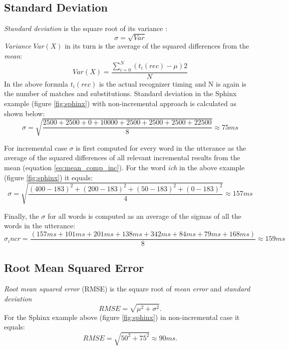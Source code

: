 \subsection {Standard Deviation}
\textit {Standard deviation} is the square root of its variance
:\begin{equation} \sigma=\sqrt {Var}
\end{equation}
\textit {Variance} $Var(X)$ in its turn is the average of the squared
differences from the \textit {mean}:
\begin{equation} Var(X)=\frac{\sum_{i=0}^N (t_i(rec)-\mu)2}{N}
\end{equation}
In the above formula $t_i(rec)$ is the actual recognizer timing and N is again
is the number of matches and substitutions.  Standard deviation in the Sphinx
example (figure \ref{fig:sphinx}) with non-incremental approach is calculated as
shown below:
\begin{equation} \sigma=\sqrt {\frac
{2500+2500+0+10000+2500+2500+2500+22500}{8}}\approx 75 ms
\end{equation}

For incremental case $\sigma$ is first computed for every word in the utterance
as the average of the squared differences of all relevant incremental results from
the mean (equation \ref{eq:mean_comp_inc}). For the word \textit {ich} in the
above example (figure \ref{fig:sphinx}) it equals:
\begin{equation} \sigma=\sqrt {\frac
{(400-183)^2+(200-183)^2+(50-183)^2+(0-183)^2}{4}}\approx 157 ms
\end{equation}

Finally, the $\sigma$ for all words is computed as an average of the sigmas of
all the words in the utterance:
\begin{equation} \sigma_incr=\frac
{(157 ms+101 ms + 201 ms+138 ms+342 ms+ 84ms +79ms +168 ms)}{8}\approx 159
ms
\end{equation}


\subsection {Root Mean Squared Error}
\textit {Root mean squared error} (RMSE) is the square root of  \textit {mean
error}  and \textit {standard deviation} \begin{equation} RMSE=\sqrt
{\mu^2+\sigma^2}. 
\end{equation}
For the Sphinx example above  (figure \ref{fig:sphinx}) in  non-incremental case
it equals:
\begin{equation} RMSE=\sqrt
{50^2+75^2} \approx 90 ms. 
\end{equation}

